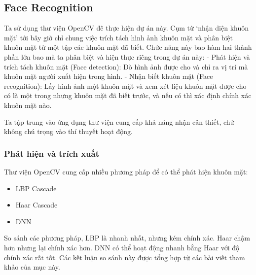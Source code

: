 \begin{Shaded}
\begin{Highlighting}[]
\FunctionTok{\{}
    \FunctionTok{:} \FunctionTok{,}
    \FunctionTok{:} \FunctionTok{,}
    \FunctionTok{:} 
\FunctionTok{\}}
\end{Highlighting}
\end{Shaded}

\hypertarget{Face_Recog}{%
\subsection{Face Recognition}\label{Face_Recog}}

Ta sử dụng thư viện OpenCV đê thực hiện dự án này. Cụm từ `nhận diện
khuôn mặt' tới bây giờ chỉ chung việc trích tách hình ảnh khuôn mặt và
phân biệt khuôn mặt từ một tập các khuôn mặt đã biết. Chức năng này bao
hàm hai thành phần lớn bao mà ta phân biệt và hiện thực riêng trong dự
án này: - Phát hiện và trích tách khuôn mặt (Face detection): Dò hình
ảnh được cho và chỉ ra vị trí mà khuôn mặt người xuất hiện trong hình. -
Nhận biết khuôn mặt (Face recognition): Lấy hình ảnh một khuôn mặt và
xem xét liệu khuôn mặt được cho có là một trong nhưng khuôn mặt đã biết
trước, và nếu có thì xác định chính xác khuôn mặt nào.

Ta tập trung vào ứng dụng thư viện cung cấp khả năng nhận cân thiết, chứ
không chú trọng vào thí thuyết hoạt động.

\hypertarget{phuxe1t-hiux1ec7n-vuxe0-truxedch-xuux1ea5t}{%
\subsubsection{Phát hiện và trích
xuất}\label{phuxe1t-hiux1ec7n-vuxe0-truxedch-xuux1ea5t}}

Thư viện OpenCV cung cấp nhiều phương pháp để có thể phát hiện khuôn
mặt:

\begin{itemize}
\tightlist
\item
  LBP Cascade
\item
  Haar Cascade
\item
  DNN
\end{itemize}

So sánh các phương pháp, LBP là nhanh nhất, nhưng kém chính xác. Haar
chậm hơn nhưng lại chính xác hơn. DNN có thể hoạt động nhanh bằng Haar
với độ chính xác rất tốt. Các kết luận so sánh này được tổng hợp từ các
bài viết tham khảo của mục này.

